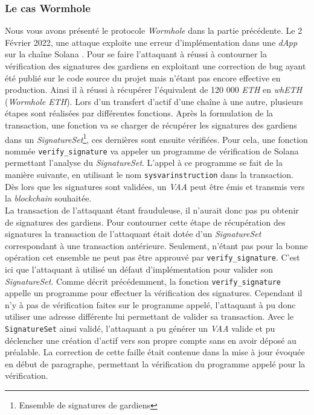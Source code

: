 \subsubsection{Le cas \gls{Wormhole}}
Nous vous avons présenté le protocole \textit{\gls{Wormhole}} dans la partie précédente. 
Le 2 Février 2022, une attaque exploite une erreur d'implémentation dans une \textit{\gls{dApp}} sur la chaîne \gls{Solana} \cite{SolMed} \cite{SolRekt}. 
Pour se faire l'attaquant à réussi à contourner la vérification des signatures des gardiens en exploitant
une correction de bug ayant été publié sur le code source du projet mais n'étant pas encore effective en production.
Ainsi il à réussi à récupérer l'équivalent de 120 000 \textit{ETH} en \textit{whETH} (\textit{\gls{Wormhole} ETH}). 
Lors d'un transfert d'\gls{actif} d'une chaîne à une autre, plusieurs étapes sont réalisées par différentes fonctions.
Après la formulation de la transaction, une fonction va se charger de récupérer les signatures des gardiens dans un \textit{SignatureSet}\footnote{Ensemble de signatures de gardiens}, ces dernières sont ensuite vérifiées. 
Pour cela, une fonction nommée \texttt{verify\_signature} va appeler un programme de vérification de Solana permettant l'analyse du \textit{SignatureSet}. 
L'appel à ce programme se fait de la manière suivante, en utilisant le nom \texttt{sysvarinstruction} \cite{SolGitError} dans la transaction. 
Dès lors que les signatures sont validées, un \textit{VAA} peut être émis et transmis vers la \textit{\gls{blockchain}} souhaitée. \\
La transaction de l'attaquant étant frauduleuse, il n'aurait donc pas pu obtenir de signatures des gardiens. 
Pour contourner cette étape de récupération des signatures la transaction de l'attaquant était dotée d'un \textit{SignatureSet} correspondant à une transaction antérieure. 
Seulement, n'étant pas pour la bonne opération cet ensemble ne peut pas être approuvé par \texttt{verify\_signature}. 
C'est ici que l'attaquant à utilisé un défaut d'implémentation pour valider son \textit{SignatureSet}. 
Comme décrit précédemment, la fonction \texttt{verify\_signature} appelle un programme pour effectuer la vérification des signatures. 
Cependant il n'y à pas de vérification faites sur le programme appelé, l'attaquant à pu donc utiliser une adresse différente lui permettant de valider sa transaction. 
Avec le  \texttt{SignatureSet} ainsi validé, l'attaquant a pu générer un \textit{VAA} valide et pu déclencher une création d'\gls{actif} vers son propre compte sans en avoir déposé au préalable. 
La correction de cette faille était contenue dans la mise à jour évoquée en début de paragraphe\cite{SolGitFixed}, permettant la vérification du programme appelé pour la vérification. 

